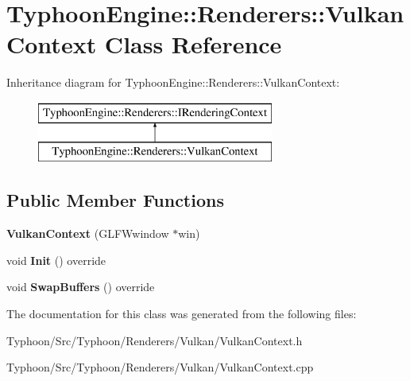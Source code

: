 \hypertarget{class_typhoon_engine_1_1_renderers_1_1_vulkan_context}{}\section{Typhoon\+Engine\+::Renderers\+::Vulkan\+Context Class Reference}
\label{class_typhoon_engine_1_1_renderers_1_1_vulkan_context}
Inheritance diagram for Typhoon\+Engine\+::Renderers\+::Vulkan\+Context\+:\begin{figure}[H]
\begin{center}
\leavevmode
\includegraphics[height=2.000000cm]{class_typhoon_engine_1_1_renderers_1_1_vulkan_context}
\end{center}
\end{figure}
\subsection*{Public Member Functions}
\begin{DoxyCompactItemize}
\item 
\mbox{\label{class_typhoon_engine_1_1_renderers_1_1_vulkan_context_a778c6d19b830d8151508b98dff626435}} 
{\bfseries Vulkan\+Context} (G\+L\+F\+Wwindow $\ast$win)
\item 
\mbox{\label{class_typhoon_engine_1_1_renderers_1_1_vulkan_context_a721b464d66fb758def77bd7d4f2d5c4b}} 
void {\bfseries Init} () override
\item 
\mbox{\label{class_typhoon_engine_1_1_renderers_1_1_vulkan_context_aae0825a3707a8331645fd50eb09cef34}} 
void {\bfseries Swap\+Buffers} () override
\end{DoxyCompactItemize}


The documentation for this class was generated from the following files\+:\begin{DoxyCompactItemize}
\item 
Typhoon/\+Src/\+Typhoon/\+Renderers/\+Vulkan/Vulkan\+Context.\+h\item 
Typhoon/\+Src/\+Typhoon/\+Renderers/\+Vulkan/Vulkan\+Context.\+cpp\end{DoxyCompactItemize}
